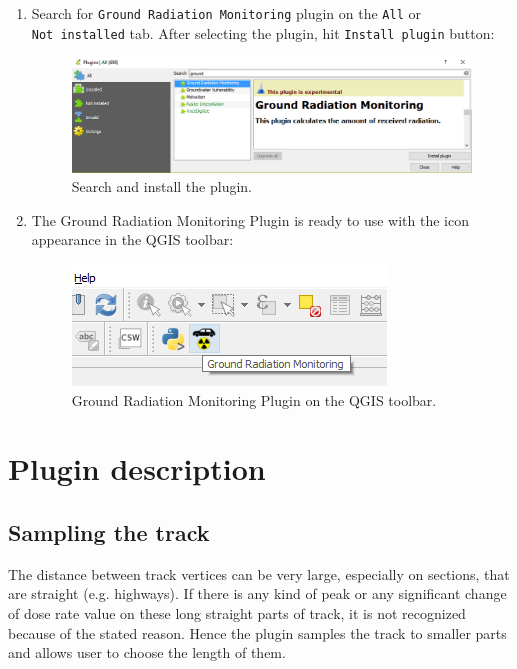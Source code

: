 \begin{enumerate}
\item 
Search for \texttt{Ground\ Radiation\ Monitoring} plugin on the
\texttt{All} or \texttt{Not\ installed} tab. After selecting the plugin,
hit \texttt{Install\ plugin} button:

\begin{figure}[H]
\centering
\includegraphics[scale=0.55]{pictures/user_guide/install_search_plugin.png}
\caption{Search and install the plugin.}
\end{figure}

\item
The Ground Radiation Monitoring Plugin is ready to use with the icon
appearance in the QGIS toolbar:

\begin{figure}[H]
\centering
\includegraphics{pictures/user_guide/install_toolbar.png}
\caption{Ground Radiation Monitoring Plugin on the QGIS toolbar.}
\end{figure}

\end{enumerate}

\section{Plugin description}

\subsection{Sampling the track}\label{sampling-the-track}

The distance between track vertices can be very large, especially on
sections, that are straight (e.g. highways). If there is any kind of
peak or any significant change of dose rate value on these long straight
parts of track, it is not recognized because of the stated reason. Hence
the plugin samples the track to smaller parts and allows user to choose
the length of them.

